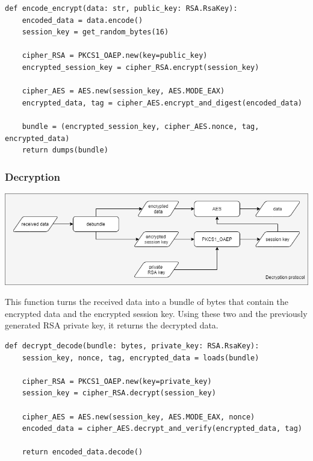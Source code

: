 \begin{verbatim}
def encode_encrypt(data: str, public_key: RSA.RsaKey):
    encoded_data = data.encode()
    session_key = get_random_bytes(16)

    cipher_RSA = PKCS1_OAEP.new(key=public_key)
    encrypted_session_key = cipher_RSA.encrypt(session_key)

    cipher_AES = AES.new(session_key, AES.MODE_EAX)
    encrypted_data, tag = cipher_AES.encrypt_and_digest(encoded_data)

    bundle = (encrypted_session_key, cipher_AES.nonce, tag, encrypted_data)
    return dumps(bundle)

\end{verbatim}

\subsubsection{Decryption}

\begin{center}
    \includegraphics[scale=0.5]{images/decryption_protocol.png}
\end{center}

This function turns the received data into a bundle of bytes that contain the encrypted data and the encrypted session key. Using these two and the previously generated RSA private key, it returns the decrypted data.

\begin{verbatim}
def decrypt_decode(bundle: bytes, private_key: RSA.RsaKey):
    session_key, nonce, tag, encrypted_data = loads(bundle)

    cipher_RSA = PKCS1_OAEP.new(key=private_key)
    session_key = cipher_RSA.decrypt(session_key)

    cipher_AES = AES.new(session_key, AES.MODE_EAX, nonce)
    encoded_data = cipher_AES.decrypt_and_verify(encrypted_data, tag)

    return encoded_data.decode()

\end{verbatim}